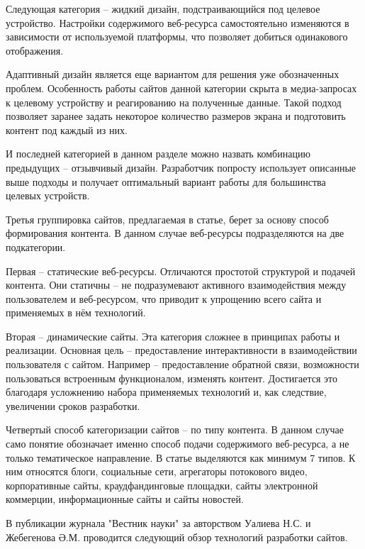 Следующая категория -- жидкий дизайн, подстраивающийся под целевое устройство.
Настройки содержимого веб-ресурса самостоятельно изменяются в зависимости от используемой платформы, что позволяет добиться одинакового отображения.

Адаптивный дизайн является еще вариантом для решения уже обозначенных проблем.
Особенность работы сайтов данной категории скрыта в медиа-запросах к целевому устройству и реагированию на полученные данные.
Такой подход позволяет заранее задать некоторое количество размеров экрана и подготовить контент под каждый из них.

И последней категорией в данном разделе можно назвать комбинацию предыдущих -- отзывчивый дизайн.
Разработчик попросту использует описанные выше подходы и получает оптимальный вариант работы для большинства целевых устройств.


Третья группировка сайтов, предлагаемая в статье, берет за основу способ формирования контента.
В данном случае веб-ресурсы подразделяются на две подкатегории.

Первая -- статические веб-ресурсы.
Отличаются простотой структурой и подачей контента.
Они статичны -- не подразумевают активного взаимодействия между пользователем и веб-ресурсом, что приводит к упрощению всего сайта и применяемых в нём технологий.

Вторая -- динамические сайты.
Эта категория сложнее в принципах работы и реализации.
Основная цель -- предоставление интерактивности в взаимодействии пользователя с сайтом.
Например -- предоставление обратной связи, возможности пользоваться встроенным функционалом, изменять контент.
Достигается это благодаря усложнению набора применяемых технологий и, как следствие, увеличении сроков разработки.


Четвертый способ категоризации сайтов -- по типу контента.
В данном случае само понятие обозначает именно способ подачи содержимого веб-ресурса, а не только тематическое направление.
В статье выделяются как минимум 7 типов.
К ним относятся блоги, социальные сети, агрегаторы потокового видео, корпоративные сайты, краудфандинговые площадки, сайты электронной коммерции, информационные сайты и сайты новостей.


В публикации журнала "Вестник науки" за авторством Уалиева Н.С. и Жебегенова Ә.М. \cite{ualiev-jebegenov-issledovanie} проводится следующий обзор технологий разработки сайтов.

